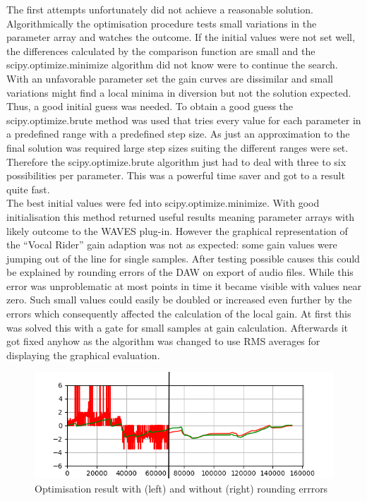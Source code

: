 The first attempts unfortunately did not achieve a reasonable solution. Algorithmically the optimisation procedure tests small variations in the parameter array and watches the outcome. If the initial values were not set well, the differences calculated by the comparison function are small and the scipy.optimize.minimize algorithm did not know were to continue the search. With an unfavorable parameter set the gain curves are dissimilar and small variations might find a local minima in diversion but not the solution expected.\\
Thus, a good initial guess was needed. To obtain a good guess the scipy.optimize.brute method was used that tries every value for each parameter in a predefined range with a predefined step size. As just an approximation to the final solution was required large step sizes suiting the different ranges were set. Therefore the scipy.optimize.brute algorithm just had to deal with three to six possibilities per parameter. This was a powerful time saver and got to a result quite fast.\\
The best initial values were fed into scipy.optimize.minimize. With good initialisation this method returned useful results meaning parameter arrays with likely outcome to the WAVES plug-in. However the graphical representation of the “Vocal Rider” gain adaption was not as expected: some gain values were jumping out of the line for single samples. After testing possible causes this could be explained by rounding errors of the DAW on export of audio files. While this error was unproblematic at most points in time it became visible with values near zero. Such small values could easily be doubled or increased even further by the errors which consequently affected the calculation of the local gain. At first this was solved this with a gate for small samples at gain calculation. Afterwards it got fixed anyhow as the algorithm was changed to use RMS averages for displaying the graphical evaluation.\\

\begin{figure}[H]
\includegraphics[width=\textwidth]{images/afterSmooth}
\caption{Optimisation result with (left) and without (right) rounding errrors}
\end{figure}


